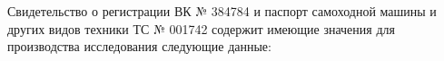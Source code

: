 %	
%	
%
%
Свидетельство о регистрации  ВК № 384784 и паспорт самоходной машины и других видов техники ТС № 001742 содержит имеющие значения для производства исследования следующие    данные:

